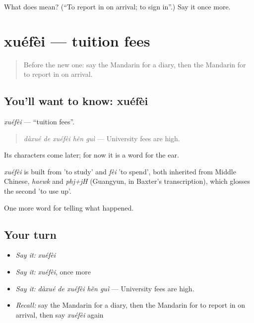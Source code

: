 \begin{tcolorbox}[breakable,colback=teal!4,colframe=teal!35!black,title={Before you move on}]
What does  mean? (\textquotedblleft{}To report in on arrival; to sign in\textquotedblright{}.) Say it once more.
\end{tcolorbox}
\section[xuéfèi]{xuéfèi — tuition fees}

\label{lesson:ZH-C304-xuefei}



\begin{quote}
Before the new one: say the Mandarin for a diary, then the Mandarin for to report in on arrival.
\end{quote}

\subsection*{You'll want to know: xuéfèi}
\emph{xuéfèi} — \textquotedblleft{}tuition fees\textquotedblright{}.

\begin{quote}
\emph{dàxué de xuéfèi hěn guì} — University fees are high.
\end{quote}

Its characters come later; for now it is a word for the ear.

\begin{cousinweb}
\emph{xuéfèi} is built from  'to study' and \emph{fèi} 'to spend', both inherited from Middle Chinese, \emph{haewk} and \emph{phj+jH} (Guangyun, in Baxter's transcription), which glosses the second 'to use up'.
\end{cousinweb}

\begin{grammarlens}[title={What you've built}]
One more word for telling what happened.
\end{grammarlens}

\subsection*{Your turn}
\begin{itemize}
\raggedright
  \item \emph{Say it:} \emph{xuéfèi}
  \item \emph{Say it:} \emph{xuéfèi}, once more
  \item \emph{Say it:} \emph{dàxué de xuéfèi hěn guì} — University fees are high.
  \item \emph{Recall:} say the Mandarin for a diary, then the Mandarin for to report in on arrival, then say \emph{xuéfèi} again
\end{itemize}

